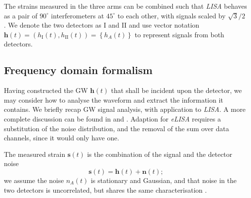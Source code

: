 \documentclass[useAMS,usedcolumn,usegraphicx,usenatbib]{mn2e}
\newcommand{\sub}[1]{\ensuremath{_\mathrm{#1}}}
\begin{document}
The strains measured in the three arms can be combined such that \textit{LISA} behaves as a pair of $90^{\circ}$ interferometers at $45^{\circ}$ to each other, with signals scaled by ${\sqrt{3}}/{2}$ \citep{Cutler1998}. We denote the two detectors as I and II and use vector notation $\boldsymbol{h}(t) = \left(h\sub{I}(t), h\sub{II}(t)\right) = \left\{h_A(t)\right\}$ to represent signals from both detectors.

\subsection{Frequency domain formalism}

Having constructed the GW $\boldsymbol{h}(t)$ that shall be incident upon the detector, we may consider how to analyse the waveform and extract the information it contains. We briefly recap GW signal analysis, with application to \textit{LISA}. A more complete discussion can be found in \citet{Finn1992} and \citet{Cutler1994}. Adaption for \textit{eLISA} requires a substitution of the noise distribution, and the removal of the sum over data channels, since it would only have one.

The measured strain $\boldsymbol{s}(t)$ is the combination of the signal and the detector noise
\begin{equation}
\boldsymbol{s}(t) = \boldsymbol{h}(t) + \boldsymbol{n}(t);
\end{equation}
we assume the noise $n_A(t)$ is stationary and Gaussian, and that noise in the two detectors is uncorrelated, but shares the same characterisation \citep{Cutler1998}.
\end{document}
